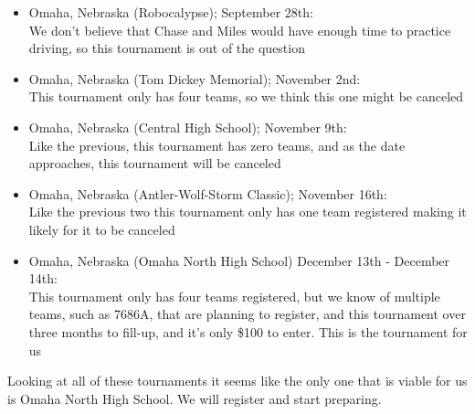 \begin{itemize}
    \item Omaha, Nebraska (Robocalypse); September 28th: \\ We don't believe that Chase and Miles would have enough time to practice driving, so this tournament is out of the question 
    \item Omaha, Nebraska (Tom Dickey Memorial); November 2nd: \\ This tournament only has four teams, so we think this one might be canceled 
    \item Omaha, Nebraska (Central High School); November 9th: \\ Like the previous, this tournament has zero teams, and as the date approaches, this tournament will be canceled 
    \item Omaha, Nebraska (Antler-Wolf-Storm Classic); November 16th: \\ Like the previous two this tournament only has one team registered making it likely for it to be canceled 
    \item Omaha, Nebraska (Omaha North High School) December 13th - December 14th: \\ This tournament only has four teams registered, but we know of multiple teams, such as 7686A, that are planning to register, and this tournament over three months to fill-up, and it's only \$100 to enter. This is the tournament for us
\end{itemize}
Looking at all of these tournaments it seems like the only one that is viable for us is Omaha North High School. We will register and start preparing.
